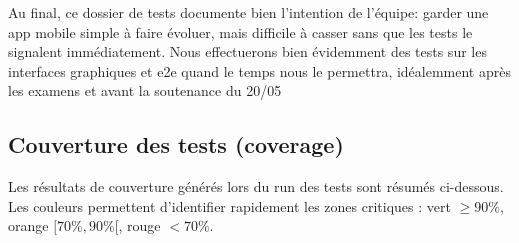 Au final, ce dossier de tests documente bien l'intention de l'équipe: garder une app mobile simple à faire évoluer, mais difficile à casser sans que les tests le signalent immédiatement. Nous effectuerons bien évidemment des tests sur les interfaces graphiques et e2e quand le temps nous le permettra, idéalemment après les examens et avant la soutenance du 20/05

\subsection{Couverture des tests (coverage)}

Les résultats de couverture générés lors du run des tests sont résumés ci-dessous. Les couleurs permettent d'identifier rapidement les zones critiques : vert $\geq 90\%$, orange $[70\%,90\%[$, rouge $<70\%$.

